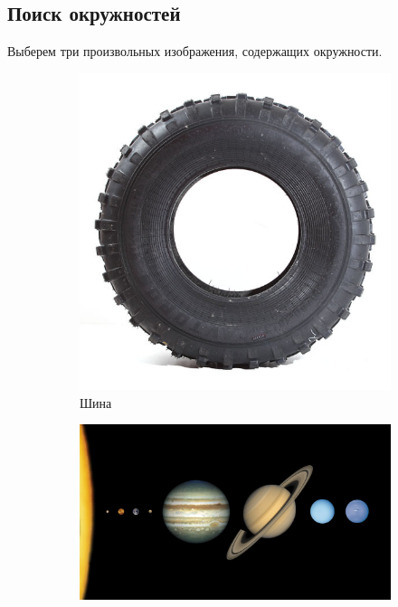 \documentclass[a4paper, 16pt]{article}
\begin{document}
    \subsection{Поиск окружностей}
    \noindent Выберем три произвольных изображения, содержащих окружности.
    \begin{figure}[htbp]
        \centering
        \begin{subfigure}{0.3\textwidth}
            \centering
            \includegraphics[scale=0.15]{ci1.png}
            \caption{Шина}
            \label{fig:ci1}
        \end{subfigure}
        \hfill
        \begin{subfigure}{0.3\textwidth}
            \centering
            \includegraphics[width=\linewidth]{ci2.png}

\end{subfigure}
\end{figure}
\end{document}
